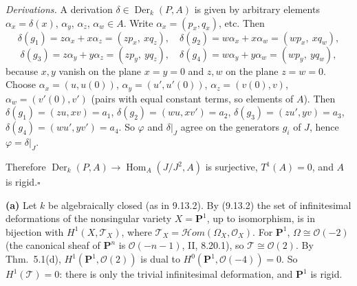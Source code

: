 \documentclass[11pt]{article}
\begin{document}
\emph{Derivations.} A derivation $\delta\in\operatorname{Der}_k(P,A)$ is given by arbitrary elements $\alpha_x=\delta(x)$, $\alpha_y$, $\alpha_z$, $\alpha_w\in A$. Write $\alpha_x=(p_x,q_x)$, etc. Then
\[
\delta(g_1)=z\alpha_x+x\alpha_z=(zp_x,\ xq_z),\quad\delta(g_2)=w\alpha_x+x\alpha_w=(wp_x,\ xq_w),
\]
\[
\delta(g_3)=z\alpha_y+y\alpha_z=(zp_y,\ yq_z),\quad\delta(g_4)=w\alpha_y+y\alpha_w=(wp_y,\ yq_w),
\]
because $x,y$ vanish on the plane $x=y=0$ and $z,w$ on the plane $z=w=0$. Choose $\alpha_x=(u,u(0))$, $\alpha_y=(u',u'(0))$, $\alpha_z=(v(0),v)$, $\alpha_w=(v'(0),v')$ (pairs with equal constant terms, so elements of $A$). Then $\delta(g_1)=(zu,xv)=a_1$, $\delta(g_2)=(wu,xv')=a_2$, $\delta(g_3)=(zu',yv)=a_3$, $\delta(g_4)=(wu',yv')=a_4$. So $\varphi$ and $\delta|_J$ agree on the generators $g_i$ of $J$, hence $\varphi=\delta|_J$.

Therefore $\operatorname{Der}_k(P,A)\to\operatorname{Hom}_A(J/J^2,A)$ is surjective, $T^1(A)=0$, and $A$ is rigid.\hfill$\square$

\pf
\textbf{(a)} Let $k$ be algebraically closed (as in 9.13.2). By (9.13.2) the set of infinitesimal deformations of the nonsingular variety $X=\mathbf P^1$, up to isomorphism, is in bijection with $H^1(X,\mathcal T_X)$, where $\mathcal T_X=\mathcal{H}om(\Omega_X,\mathcal O_X)$. For $\mathbf P^1$, $\Omega\cong\mathcal O(-2)$ (the canonical sheaf of $\mathbf P^n$ is $\mathcal O(-n-1)$, II, 8.20.1), so $\mathcal T\cong\mathcal O(2)$. By Thm.~5.1(d), $H^1(\mathbf P^1,\mathcal O(2))$ is dual to $H^0(\mathbf P^1,\mathcal O(-4))=0$. So $H^1(\mathcal T)=0$: there is only the trivial infinitesimal deformation, and $\mathbf P^1$ is rigid.
\end{document}
